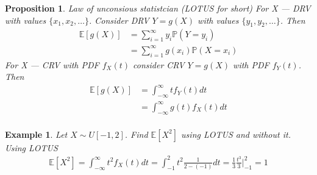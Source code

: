 \documentclass[10pt]{article}
\newtheorem*{proposition}{Proposition}
\newtheorem*{example}{Example}
\begin{document}
\begin{proposition} Law of unconsious statistcian (LOTUS for short) For X ---
    DRV with values $\{x_1,x_2,\ldots \}$. Consider DRV $Y=g(X)$ with values
    $\{y_1,y_2,\ldots \}$. Then
    \begin{align}
        \mathbb{E}[g(X)]
         & =\sum_{i=1}^\infty y_i\mathbb{P}(Y=y_i)    \\
         & =\sum_{i=1}^\infty g(x_i)\mathbb{P}(X=x_i)
    \end{align}
    For X --- CRV with PDF $f_X(t)$ consider CRV $Y=g(X)$ with PDF $f_Y(t)$.
    Then
    \begin{align}
        \mathbb{E}[g(X)]
         & =\int_{-\infty}^{\infty} tf_Y(t)dt    \\
         & =\int_{-\infty}^{\infty} g(t)f_X(t)dt \\
    \end{align}
\end{proposition}

\begin{example} Let $X\sim U[-1,2]$. Find $\mathbb{E}[X^2]$ using LOTUS and
    without it. Using LOTUS
    \begin{align}
        \mathbb{E}[X^2]
        =\int_{-\infty}^\infty t^2 f_X(t)dt
        =\int_{-1}^{2} t^2 \frac{1}{2-(-1)}dt
        =\frac{1}{3}\frac{t^3}{3}\Biggl|_{-1}^2=1
    \end{align}
\end{example}
\end{document}
